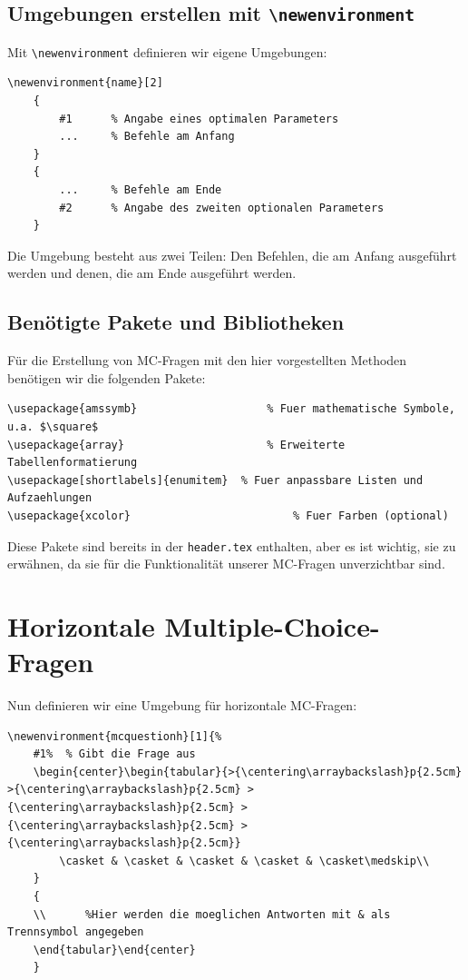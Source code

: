 \subsection{Umgebungen erstellen mit \texttt{\textbackslash newenvironment}}

Mit \texttt{\textbackslash newenvironment} definieren wir eigene Umgebungen:

\begin{lstlisting}[style=latex]
% Syntax: \newenvironment{umgebungsname}[anzahl_parameter]{beginn_definitionen}{ende_definitionen}
\newenvironment{name}[2]
	{
		#1		% Angabe eines optimalen Parameters
		...		% Befehle am Anfang
	}
  	{
		...		% Befehle am Ende
		#2		% Angabe des zweiten optionalen Parameters
	}
\end{lstlisting}

Die Umgebung besteht aus zwei Teilen: Den Befehlen, die am Anfang ausgeführt werden und denen, die am Ende ausgeführt werden.

\subsection{Benötigte Pakete und Bibliotheken}

Für die Erstellung von MC-Fragen mit den hier vorgestellten Methoden benötigen wir die folgenden Pakete:

\begin{lstlisting}[style=latex]
\usepackage{amssymb}          			% Fuer mathematische Symbole, u.a. $\square$
\usepackage{array}            			% Erweiterte Tabellenformatierung
\usepackage[shortlabels]{enumitem}	% Fuer anpassbare Listen und Aufzaehlungen
\usepackage{xcolor}          		 		% Fuer Farben (optional)
\end{lstlisting}

Diese Pakete sind bereits in der \texttt{header.tex} enthalten, aber es ist wichtig, sie zu erwähnen, da sie für die Funktionalität unserer MC-Fragen unverzichtbar sind.


\section{Horizontale Multiple-Choice-Fragen}


Nun definieren wir eine Umgebung für horizontale MC-Fragen:

\begin{lstlisting}[style=latex]
% Umgebung fuer horizontale MC-Fragen
\newenvironment{mcquestionh}[1]{%
	#1%  % Gibt die Frage aus
	\begin{center}\begin{tabular}{>{\centering\arraybackslash}p{2.5cm} >{\centering\arraybackslash}p{2.5cm} >{\centering\arraybackslash}p{2.5cm} >{\centering\arraybackslash}p{2.5cm} >{\centering\arraybackslash}p{2.5cm}}
		\casket & \casket & \casket & \casket & \casket\medskip\\
	}
	{
	\\		%Hier werden die moeglichen Antworten mit & als Trennsymbol angegeben
	\end{tabular}\end{center}
	}
\end{lstlisting}

